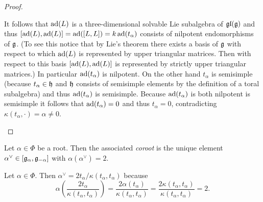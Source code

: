 \begin{proof}
\begin{enumerate}[leftmargin=*]
   It follows that $\operatorname{ad}(L)$ is a three-dimensional solvable Lie subalgebra of $\mathfrak{gl}(\mathfrak{g})$ and thus $[\operatorname{ad}(L), \operatorname{ad}(L)] = \operatorname{ad}([L,L]) = k \operatorname{ad}(t_\alpha)$ consists of nilpotent endomorphisms of $\mathfrak{g}$. (To see this notice that by Lie’s theorem there exists a basis of $\mathfrak{g}$ with respect to which $\operatorname{ad}(L)$ is represented by upper triangular matrices. Then with respect to this basis $[\operatorname{ad}(L), \operatorname{ad}(L)]$ is represented by strictly upper triangular matrices.) In particular $\operatorname{ad}(t_\alpha)$ is nilpotent. On the other hand $t_\alpha$ is semisimple (because $t_\alpha \in \mathfrak{h}$ and $\mathfrak{h}$ consists of semisimple elements by the definition of a toral subalgebra) and thus $\operatorname{ad}(t_\alpha)$ is semisimple. Because $\operatorname{ad}(t_\alpha)$ is both nilpotent is semisimple it follows that $\operatorname{ad}(t_\alpha) = 0$ and thus $t_\alpha = 0$, contradicting $\kappa(t_\alpha, \cdot) = \alpha \neq 0$.
  \qedhere
 \end{enumerate}
\end{proof}


\begin{defi}
 Let $\alpha \in \Phi$ be a root. Then the associated \emph{coroot} is the unique element $\alpha^\vee \in [\mathfrak{g}_\alpha, \mathfrak{g}_{-\alpha}]$ with $\alpha(\alpha^\vee) = 2$.
\end{defi}


\begin{rem}
 Let $\alpha \in \Phi$. Then $\alpha^\vee = 2 t_\alpha / \kappa(t_\alpha, t_\alpha)$ because
 \[
  \alpha\left( \frac{2 t_\alpha}{\kappa(t_\alpha, t_\alpha)} \right)
  = \frac{2\alpha(t_\alpha)}{\kappa(t_\alpha, t_\alpha)}
  = \frac{2\kappa(t_\alpha,t_\alpha)}{\kappa(t_\alpha, t_\alpha)}
  = 2.
 \]
 
\end{rem}






















